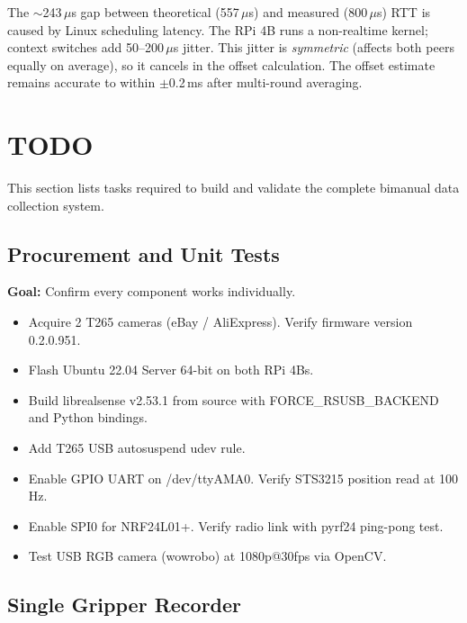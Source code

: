 \documentclass[11pt,a4paper]{article}
\begin{document}
\begin{infobox}
The ${\sim}$243\,$\mu$s gap between theoretical (557\,$\mu$s) and measured (800\,$\mu$s) RTT is caused by Linux scheduling latency. The RPi 4B runs a non-realtime kernel; context switches add 50--200\,$\mu$s jitter. This jitter is \emph{symmetric} (affects both peers equally on average), so it cancels in the offset calculation. The offset estimate remains accurate to within $\pm$0.2\,ms after multi-round averaging.
\end{infobox}


\section{TODO}

This section lists tasks required to build and validate the complete bimanual data collection system.

\subsection{Procurement and Unit Tests}

\textbf{Goal:} Confirm every component works individually.

\begin{itemize}[label=$\square$]
  \item Acquire 2 T265 cameras (eBay / AliExpress). Verify firmware version 0.2.0.951.
  \item Flash Ubuntu 22.04 Server 64-bit on both RPi 4Bs.
  \item Build librealsense v2.53.1 from source with FORCE\_RSUSB\_BACKEND and Python bindings.
  \item Add T265 USB autosuspend udev rule.
  \item Enable GPIO UART on /dev/ttyAMA0. Verify STS3215 position read at 100\,Hz.
  \item Enable SPI0 for NRF24L01+. Verify radio link with pyrf24 ping-pong test.
  \item Test USB RGB camera (wowrobo) at 1080p@30fps via OpenCV.
\end{itemize}

\subsection{Single Gripper Recorder}
\end{document}
